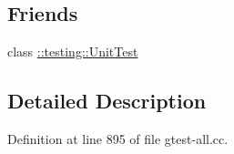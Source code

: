 \subsection*{\-Friends}
\begin{DoxyCompactItemize}
\item 
class \hyperlink{classtesting_1_1internal_1_1UnitTestImpl_a893404438388dec058dc5c02e8f9a014}{\-::testing\-::\-Unit\-Test}
\end{DoxyCompactItemize}


\subsection{\-Detailed \-Description}


\-Definition at line 895 of file gtest-\/all.\-cc.



